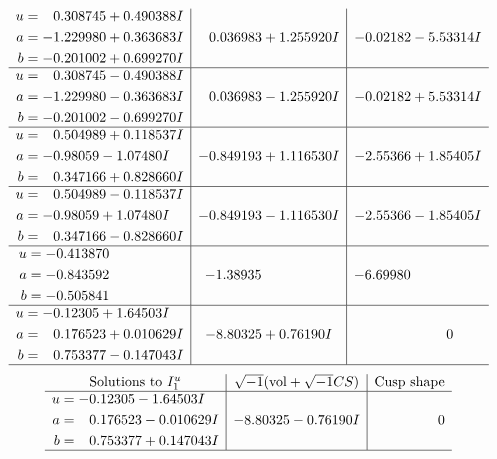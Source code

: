 \documentclass[1p]{elsarticle_modified}
\theoremstyle{definition}
\newcommand{\I}{\sqrt{-1}}
\begin{document}
$$\begin{array}{c|c|c}
\begin{aligned}
u &= \phantom{-}0.308745 + 0.490388 I \\
a &= -1.229980 + 0.363683 I \\
b &= -0.201002 + 0.699270 I\end{aligned}
 & \phantom{-}0.036983 + 1.255920 I & -0.02182 - 5.53314 I \\ \hline\begin{aligned}
u &= \phantom{-}0.308745 - 0.490388 I \\
a &= -1.229980 - 0.363683 I \\
b &= -0.201002 - 0.699270 I\end{aligned}
 & \phantom{-}0.036983 - 1.255920 I & -0.02182 + 5.53314 I \\ \hline\begin{aligned}
u &= \phantom{-}0.504989 + 0.118537 I \\
a &= -0.98059 - 1.07480 I \\
b &= \phantom{-}0.347166 + 0.828660 I\end{aligned}
 & -0.849193 + 1.116530 I & -2.55366 + 1.85405 I \\ \hline\begin{aligned}
u &= \phantom{-}0.504989 - 0.118537 I \\
a &= -0.98059 + 1.07480 I \\
b &= \phantom{-}0.347166 - 0.828660 I\end{aligned}
 & -0.849193 - 1.116530 I & -2.55366 - 1.85405 I \\ \hline\begin{aligned}
u &= -0.413870\phantom{ +0.000000I} \\
a &= -0.843592\phantom{ +0.000000I} \\
b &= -0.505841\phantom{ +0.000000I}\end{aligned}
 & -1.38935\phantom{ +0.000000I} & -6.69980\phantom{ +0.000000I} \\ \hline\begin{aligned}
u &= -0.12305 + 1.64503 I \\
a &= \phantom{-}0.176523 + 0.010629 I \\
b &= \phantom{-}0.753377 - 0.147043 I\end{aligned}
 & -8.80325 + 0.76190 I & \phantom{-0.000000 } 0\\
 \hline 
 \end{array}$$\newpage$$\begin{array}{c|c|c}  
\text{Solutions to }I^u_{1}& \I (\text{vol} + \sqrt{-1}CS) & \text{Cusp shape}\\
 \hline 
\begin{aligned}
u &= -0.12305 - 1.64503 I \\
a &= \phantom{-}0.176523 - 0.010629 I \\
b &= \phantom{-}0.753377 + 0.147043 I\end{aligned}
 & -8.80325 - 0.76190 I & \phantom{-0.000000 } 0\\
 \hline 
 \end{array}$$\newpage\newpage\renewcommand{\arraystretch}{1}
\end{document}

